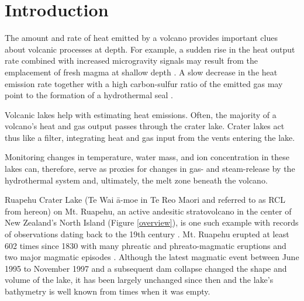 \documentclass[doublespacing, linenumbers]{bmcart}
\begin{document}


\section{Introduction}

The amount and rate of heat emitted by a volcano provides important clues about
volcanic processes at depth. For example, a sudden rise in the heat output rate
combined with increased microgravity signals may result from the emplacement of
fresh magma at shallow depth \cite{Brown1991}. A slow decrease in the heat
emission rate together with a high carbon-sulfur ratio of the emitted gas may
point to the formation of a hydrothermal seal
\cite{christensonCyclicProcessesFactors2010}.

Volcanic lakes help with estimating heat emissions. Often, the majority of a
volcano's heat and gas output passes through the crater lake. Crater lakes act thus
like a filter, integrating heat and gas input from the vents entering the lake.

Monitoring changes in temperature, water mass, and ion concentration in these
lakes can, therefore, serve as proxies for changes in gas- and steam-release by
the hydrothermal system and, ultimately, the melt zone beneath the volcano. 

Ruapehu Crater Lake (Te Wai \={a}-moe in Te Reo Maori and referred to as RCL from
hereon) on Mt. Ruapehu, an active andesitic stratovolcano in the center of New
Zealand's North Island (Figure \ref{overview}), is one such example with records
of observations dating back to the 19th century \cite{Friedlander1898}. Mt.
Ruapehu erupted at least 602 times since 1830 with many phreatic and
phreato-magmatic eruptions and two major magmatic episodes
\citep{Scott2013,HistoricEruptiveActivity2022}. Although the latest magmatic
event between June 1995 to November 1997 and a subsequent dam collapse changed
the shape and volume of the lake, it has been largely unchanged since then and
the lake's bathymetry is well known from times when it was empty.
\end{document}
